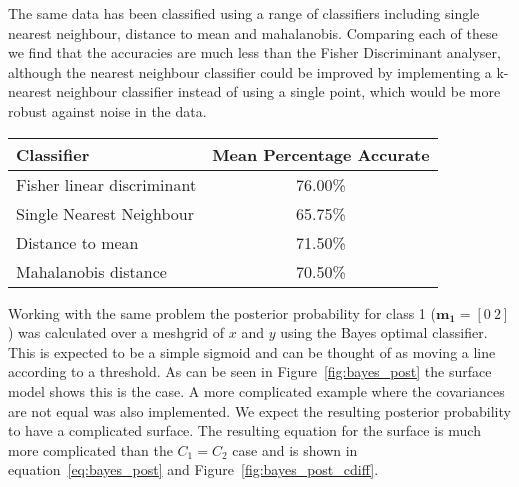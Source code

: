 \documentclass[a4paper,10pt]{article}
\begin{document}
The same data has been classified using a range of classifiers including single nearest neighbour, distance to mean and mahalanobis. Comparing each of these we find that the accuracies are much less than the Fisher Discriminant analyser, although the nearest neighbour classifier could be improved by implementing a k-nearest neighbour classifier instead of using a single point, which would be more robust against noise in the data.

\begin{table}[!ht]
\centering
\begin{tabular}{l c}
\hline
\textbf{Classifier} & \textbf{Mean Percentage Accurate}\\
\hline
Fisher linear discriminant & 76.00\% \\
Single Nearest Neighbour & 65.75\% \\
Distance to mean & 71.50\% \\
Mahalanobis distance & 70.50\%
\end{tabular}
\end{table}

Working with the same problem the posterior probability for class 1 ($\mathbf{m_1} = [0~2]$) was calculated over a meshgrid of $x$ and $y$ using the Bayes optimal classifier. This is expected to be a simple sigmoid and can be thought of as moving a line according to a threshold. As can be seen in Figure~\ref{fig:bayes_post} the surface model shows this is the case. A more complicated example where the covariances are not equal was also implemented. We expect the resulting posterior probability to have a complicated surface. The resulting equation for the surface is much more complicated than the $C_1 = C_2$ case and is shown in equation~\ref{eq:bayes_post} and Figure~\ref{fig:bayes_post_cdiff}.
\end{document}
